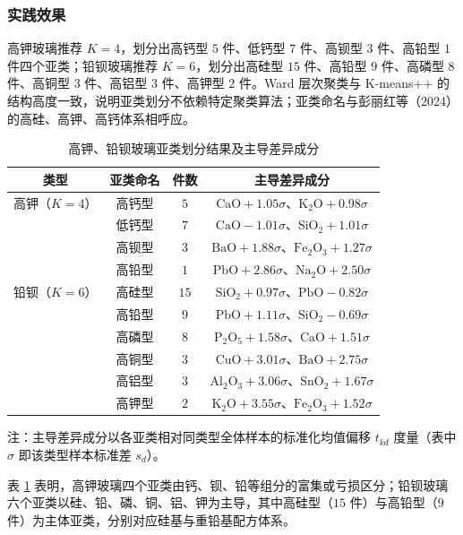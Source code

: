 \documentclass{ctexart}
\begin{document}
\subsubsection{实践效果}

高钾玻璃推荐 $K=4$，划分出高钙型 $5$ 件、低钙型 $7$ 件、高钡型 $3$ 件、高铅型 $1$ 件四个亚类；铅钡玻璃推荐 $K=6$，划分出高硅型 $15$ 件、高铅型 $9$ 件、高磷型 $8$ 件、高铜型 $3$ 件、高铝型 $3$ 件、高钾型 $2$ 件。Ward 层次聚类与 K-means++ 的结构高度一致，说明亚类划分不依赖特定聚类算法；亚类命名与彭丽红等（2024）的高硅、高钾、高钙体系相呼应。

\begin{table}[htbp]
\centering
\caption{高钾、铅钡玻璃亚类划分结果及主导差异成分}
\label{tab:subclass}
\begin{tabular}{c|c|c|c}
\hline
类型 & 亚类命名 & 件数 & 主导差异成分 \\
\hline
高钾（$K=4$） & 高钙型 & $5$ & $\mathrm{CaO}+1.05\sigma$、$\mathrm{K_2O}+0.98\sigma$ \\
 & 低钙型 & $7$ & $\mathrm{CaO}-1.01\sigma$、$\mathrm{SiO_2}+1.01\sigma$ \\
 & 高钡型 & $3$ & $\mathrm{BaO}+1.88\sigma$、$\mathrm{Fe_2O_3}+1.27\sigma$ \\
 & 高铅型 & $1$ & $\mathrm{PbO}+2.86\sigma$、$\mathrm{Na_2O}+2.50\sigma$ \\
铅钡（$K=6$） & 高硅型 & $15$ & $\mathrm{SiO_2}+0.97\sigma$、$\mathrm{PbO}-0.82\sigma$ \\
 & 高铅型 & $9$ & $\mathrm{PbO}+1.11\sigma$、$\mathrm{SiO_2}-0.69\sigma$ \\
 & 高磷型 & $8$ & $\mathrm{P_2O_5}+1.58\sigma$、$\mathrm{CaO}+1.51\sigma$ \\
 & 高铜型 & $3$ & $\mathrm{CuO}+3.01\sigma$、$\mathrm{BaO}+2.75\sigma$ \\
 & 高铝型 & $3$ & $\mathrm{Al_2O_3}+3.06\sigma$、$\mathrm{SnO_2}+1.67\sigma$ \\
 & 高钾型 & $2$ & $\mathrm{K_2O}+3.55\sigma$、$\mathrm{Fe_2O_3}+1.52\sigma$ \\
\hline
\end{tabular}
\end{table}

注：主导差异成分以各亚类相对同类型全体样本的标准化均值偏移 $t_{kd}$ 度量（表中 $\sigma$ 即该类型样本标准差 $s_d$）。

表 \ref{tab:subclass} 表明，高钾玻璃四个亚类由钙、钡、铅等组分的富集或亏损区分；铅钡玻璃六个亚类以硅、铅、磷、铜、铝、钾为主导，其中高硅型（$15$ 件）与高铅型（$9$ 件）为主体亚类，分别对应硅基与重铅基配方体系。
\end{document}
